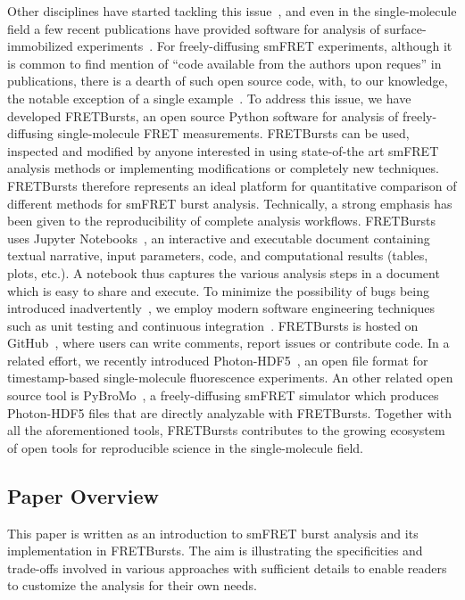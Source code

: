 \documentclass[10pt,letterpaper]{article}
\begin{document}
Other disciplines have started tackling this issue~\cite{Eglen_2016},
and even in the single-molecule field a few recent publications have provided
software for analysis of surface-immobilized experiments~\cite{McKinney_2006,Bronson_2009,Greenfeld_2012,K_nig_2013,van_de_Meent_2014}.
For freely-diffusing smFRET experiments, although it is common to find mention of
``code available from the authors upon reques'' in publications, there is a dearth
of such open source code, with, to our knowledge, the notable exception of a single
example~\cite{Murphy2014}.
To address this issue, we have developed FRETBursts,
an open source Python software for analysis of freely-diffusing single-molecule FRET measurements.
FRETBursts can be used, inspected and modified by anyone interested in using
state-of-the art smFRET analysis methods or implementing modifications or completely new techniques.
FRETBursts therefore represents an ideal platform
for quantitative comparison of different methods for smFRET burst analysis.
Technically, a strong emphasis has been given to the reproducibility of complete analysis
workflows. FRETBursts uses Jupyter Notebooks~\cite{Shen_2014},
an interactive and executable document containing textual narrative, input parameters,
code, and computational results (tables, plots, etc.). A notebook thus captures the various analysis steps
in a document which is easy to share and execute.
To minimize the possibility of bugs being introduced inadvertently~\cite{Soergel_2015},
we employ modern software engineering techniques
such as unit testing and continuous integration~\cite{Wilson_2014,Eglen_2016}.
FRETBursts is hosted on GitHub~\cite{Blischak_2016,Prli__2012},
where users can write comments, report issues or contribute code.
In a related effort, we recently introduced Photon-HDF5~\cite{Ingargiola2016},
an open file format for timestamp-based single-molecule fluorescence
experiments. An other related open source tool is PyBroMo~\cite{Ingargiola_2016},
a freely-diffusing smFRET simulator which produces Photon-HDF5 files that are
directly analyzable with FRETBursts.
Together with all the aforementioned tools, FRETBursts contributes to the growing
ecosystem of open tools for reproducible science in the single-molecule field.

\subsection*{Paper Overview}
This paper is written as an introduction to smFRET burst analysis and
its implementation in FRETBursts.
The aim is illustrating the specificities and
trade-offs involved in various approaches
with sufficient details to enable readers
to customize the analysis for their own needs.
\end{document}
